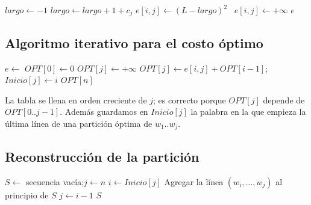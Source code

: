 \begin{algorithm}[H]
\caption{Cálculo de los costos de línea}
\begin{algorithmic}[1]
    \State $largo\gets -1$
      \State $largo\gets largo + 1 + c_j$ 
       $e[i,j]\gets (L-largo)^2$ \Else\ $e[i,j]\gets +\infty$ \EndIf
    \EndFor
  \EndFor
  \State \Return $e$
\EndFunction
\end{algorithmic}
\end{algorithm}

\subsection*{Algoritmo iterativo para el costo óptimo}

\begin{algorithm}[H]
\caption{Pretty printing: costo mínimo}
\begin{algorithmic}[1]
  \State $e\gets$ 
  \State $OPT[0]\gets 0$
    \State $OPT[j]\gets +\infty$
        \State $OPT[j]\gets e[i,j]+OPT[i-1]$;\quad $Inicio[j]\gets i$
      \EndIf
    \EndFor
  \EndFor
  \State \Return $OPT[n]$
\EndFunction
\end{algorithmic}
\end{algorithm}

La tabla se llena en orden creciente de $j$; es correcto porque $OPT[j]$ depende de $OPT[0..j-1]$. Además guardamos en $Inicio[j]$ la palabra en la que empieza la última línea de una partición óptima de $w_1..w_j$.

\subsection*{Reconstrucción de la partición}

\begin{algorithm}[H]
\caption{Pretty printing: partición óptima}
\begin{algorithmic}[1]
  \State $S\gets$ secuencia vacía;\quad $j\gets n$
    \State $i\gets Inicio[j]$
    \State Agregar la línea $(w_i,\dots,w_j)$ al principio de $S$
    \State $j\gets i-1$
  \EndWhile
  \State \Return $S$
\EndFunction
\end{algorithmic}
\end{algorithm}

